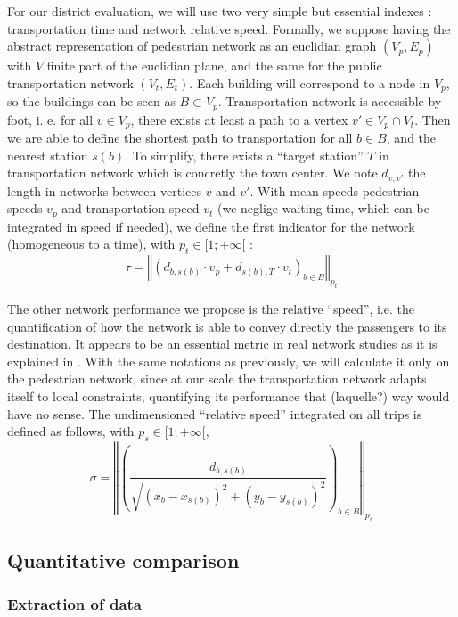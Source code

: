 \documentclass[english]{article}
\begin{document}
For our district evaluation, we will use two very simple but essential
indexes : transportation time and network relative speed. Formally,
we suppose having the abstract representation of pedestrian network
as an euclidian graph $(V_{p},E_{p})$ with $V$ finite part of the
euclidian plane, and the same for the public transportation network
$(V_{t},E_{t})$. Each building will correspond to a node in $V_{p}$,
so the buildings can be seen as $B\subset V_{p}$. Transportation
network is accessible by foot, i. e. for all $v\in V_{p}$, there
exists at least a path to a vertex $v'\in V_{p}\cap V_{t}$. Then
we are able to define the shortest path to transportation for all
$b\in B$, and the nearest station $s(b)$. To simplify, there exists
a ``target station'' $T$ in transportation network which is concretly
the town center. We note $d_{v,v'}$ the length in networks between
vertices $v$ and $v'$. With mean speeds pedestrian speeds $v_{p}$
and transportation speed $v_{t}$ (we neglige waiting time, which
can be integrated in speed if needed), we define the first indicator
for the network (homogeneous to a time), with $p_{t}\in[1;+\infty[$
:
\[
\tau=\left\Vert \left(d_{b,s(b)}\cdot v_{p}+d_{s(b),T}\cdot v_{t}\right)_{b\in B}\right\Vert _{p_{t}}
\]


The other network performance we propose is the relative ``speed'',
i.e. the quantification of how the network is able to convey directly
the passengers to its destination. It appears to be an essential metric in real network
studies as it is explained in \cite{banos2012towards}. With the same
notations as previously, we will calculate it only on the pedestrian
network, since at our scale the transportation network adapts itself
to local constraints, quantifying its performance that (laquelle?) way would have
no sense. The undimensioned ``relative speed'' integrated on all
trips is defined as follows, with $p_{s}\in[1;+\infty[$,
\[
\sigma=\left\Vert \left(\frac{d_{b,s(b)}}{\sqrt{(x_{b}-x_{s(b)})^{2}+(y_{b}-y_{s(b)})^{2}}}\right)_{b\in B}\right\Vert _{p_{s}}
\]



\subsection{Quantitative comparison}


\subsubsection{Extraction of data}
\end{document}

